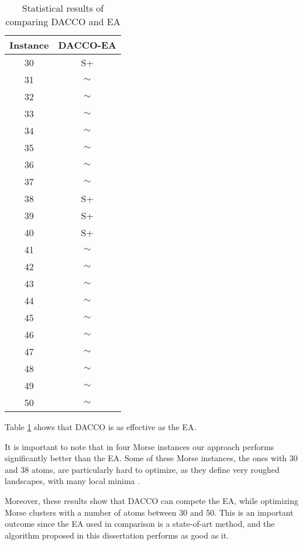 			\pagebreak
			\begin{table}[!htdp]
					\begin{center}
						\begin{tabular}{| c | c |}
							\hline
							\textbf{Instance} & \textbf{DACCO-EA} \\ \hline
							30 & S+ \\ \hline
							31 & $\sim$ \\ \hline
							32 & $\sim$ \\ \hline
							33 & $\sim$ \\ \hline
							34 & $\sim$ \\ \hline
							35 & $\sim$ \\ \hline
							36 & $\sim$ \\ \hline
							37 & $\sim$ \\ \hline
							38 & S+ \\ \hline
							39 & S+ \\ \hline
							40 & S+ \\\hline
							41 & $\sim$ \\ \hline
							42 & $\sim$ \\ \hline
							43 & $\sim$ \\ \hline
							44 & $\sim$ \\ \hline
							45 & $\sim$ \\ \hline
							46 & $\sim$ \\ \hline
							47 & $\sim$ \\ \hline
							48 & $\sim$ \\ \hline 
							49 & $\sim$ \\ \hline
							50 & $\sim$ \\ \hline
						\end{tabular}
						\caption{Statistical results of comparing DACCO and EA}
						\label{tab:statistical_comparison_ea}
					\end{center}
			\end{table}
		Table \ref{tab:statistical_comparison_ea} shows that DACCO is as effective as the EA.
		
		It is important to note that in four Morse instances our approach performs significantly better than the EA. Some of these Morse instances,  the ones with 30 and 38 atoms, are particularly hard to optimize, as they define very roughed landscapes, with many local minima \cite{doye97}.
		
		Moreover, these results show that DACCO can compete the EA, while optimizing Morse clusters with a number of atoms between 30 and 50. This is an important outcome since the EA  used in comparison is a state-of-art method, and the algorithm proposed in this dissertation performs as good as it.
		
